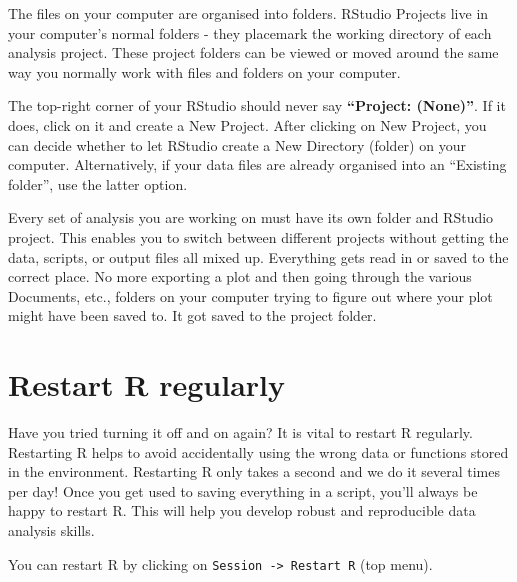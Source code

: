 \documentclass[
  12pt,
  krantz2]{krantz}
\renewenvironment{quote}{\begin{VF}}{\end{VF}}
\begin{document}
The files on your computer are organised into folders.
RStudio Projects live in your computer's normal folders - they placemark the working directory of each analysis project.
These project folders can be viewed or moved around the same way you normally work with files and folders on your computer.

The top-right corner of your RStudio should never say \textbf{``Project: (None)''}.
If it does, click on it and create a New Project.
After clicking on New Project, you can decide whether to let RStudio create a New Directory (folder) on your computer. Alternatively, if your data files are already organised into an ``Existing folder'', use the latter option.

Every set of analysis you are working on must have its own folder and RStudio project.
This enables you to switch between different projects without getting the data, scripts, or output files all mixed up.
Everything gets read in or saved to the correct place.
No more exporting a plot and then going through the various Documents, etc., folders on your computer trying to figure out where your plot might have been saved to.
It got saved to the project folder.

\hypertarget{restart-r-regularly}{%
\section{Restart R regularly}\label{restart-r-regularly}}

Have you tried turning it off and on again? It is vital to restart R regularly.
Restarting R helps to avoid accidentally using the wrong data or functions stored in the environment.
Restarting R only takes a second and we do it several times per day!
Once you get used to saving everything in a script, you'll always be happy to restart R.
This will help you develop robust and reproducible data analysis skills.

\begin{quote}
You can restart R by clicking on \texttt{Session\ -\textgreater{}\ Restart\ R} (top menu).
\end{quote}
\end{document}
